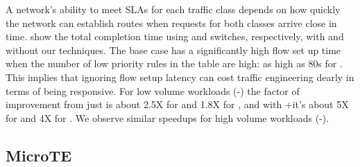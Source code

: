 A network's ability to meet SLAs for each traffic class depends on how
quickly the network can establish routes when requests for both classes
arrive close in time.
 show the total completion time using
\BroadcomOne and \Intel switches, respectively, with and without our
techniques. The base case has a significantly high flow set up time when the
number of low priority rules in the table are high: as high as 80s for
\BroadcomOne. This implies that ignoring flow setup latency can cost traffic
engineering dearly in terms of being responsive.  For low volume workloads
(\sA-\sC) the factor of improvement from just \FE is about 2.5X for
\BroadcomOne and 1.8X for \Intel, and with \FE+\RO it's about 5X for
\BroadcomOne and 4X for \Intel. We observe similar speedups for high volume
workloads (\sD-\sF). 





\begin{figure}
{}
\label{qosResults}
\end{figure}

\subsection{MicroTE}

